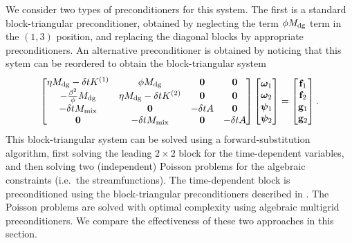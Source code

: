 \documentclass[review]{siamart}
\begin{document}
We consider two types of preconditioners for this system.
The first is a standard block-triangular preconditioner, obtained by neglecting the term $\phi M_{\rm dg}$ term in the $(1,3)$ position, and replacing the diagonal blocks by appropriate preconditioners.
An alternative preconditioner is obtained by noticing that this sytem can be reordered to obtain the block-triangular system
\begin{align} \label{eq:vsf-system-2}
	\begin{bmatrix}
		\eta M_{\rm dg} - \delta t K^{(1)} & \phi M_{\rm dg} & \mathbf{0} & \mathbf{0} \\
		-\tfrac{\beta^2}{\phi}M_{\rm dg} & \eta M_{\rm dg} - \delta t K^{(2)}  & \mathbf{0}& \mathbf{0} \\
		-\delta t M_{\rm mix} & \mathbf{0} & -\delta t A & \mathbf{0} \\
		\mathbf{0} & -\delta t M_{\rm mix} & \mathbf{0} & -\delta t A
	\end{bmatrix}
	\begin{bmatrix} \bm\omega_1 \\ \bm\omega_2 \\ \bm\psi_1 \\ \bm\psi_2 \end{bmatrix}
	=
	\begin{bmatrix} \mathbf{f}_1 \\ \mathbf{f}_2 \\ \mathbf{g}_1 \\ \mathbf{g}_2 \end{bmatrix}.
\end{align}
This block-triangular system can be solved using a forward-substitution algorithm, first solving the leading $2\times2$ block for the time-dependent variables, and then solving two (independent) Poisson problems for the algebraic constraints (i.e.\ the streamfunctions).
The time-dependent block is preconditioned using the block-triangular preconditioners described in .
The Poisson problems are solved with optimal complexity using algebraic multigrid preconditioners.
We compare the effectiveness of these two approaches in this section.
\end{document}
